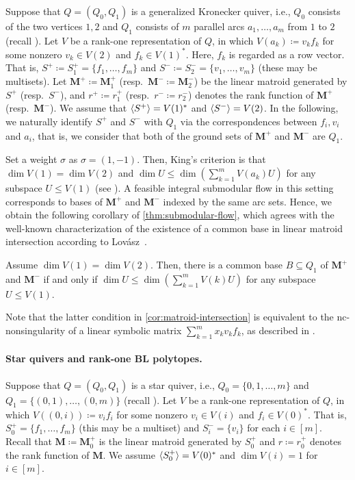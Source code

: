 \documentclass[a4paper,11pt]{article}
\numberwithin{equation}{section}
\newcommand{\M}{\mathbf{M}}
\DeclarePairedDelimiter{\spnn}{\langle}{\rangle}
\begin{document}
Suppose that $Q = (Q_0, Q_1)$ is a generalized Kronecker quiver, i.e.,
$Q_0$ consists of the two vertices $1, 2$ and $Q_1$ consists of $m$ parallel arcs $a_1, \dots, a_m$ from $1$ to $2$
(recall ).
Let $V$ be a rank-one representation of $Q$, in which
$V(a_k) \coloneqq v_k f_k$ for some nonzero $v_k \in V(2)$ and $f_k \in V(1)^*$.
Here, $f_k$ is regarded as a row vector.
That is,
$S^+ \coloneqq S_1^+ = \{ f_1, \dots, f_m \}$ and $S^- \coloneqq S_2^- = \{ v_1, \dotsc, v_m \}$ (these may be multisets).
Let $\M^+ \coloneqq \M_1^+$ (resp.\ $\M^- \coloneqq \M_2^-$) be the linear matroid generated by $S^+$ (resp.\ $S^-$), and $r^+ \coloneqq r_1^+$ (resp.\ $r^- \coloneqq r_2^-$) denotes the rank function of $\M^+$ (resp.\ $\M^-$).
We assume that $\spnn{S^+} = V(1)^*$ and $\spnn{S^-} = V(2)$.
In the following, we naturally identify $S^+$ and $S^-$ with $Q_1$ via the correspondences between $f_i, v_i$ and $a_i$,
that is, we consider that both of the ground sets of $\M^+$ and $\M^-$ are $Q_1$.

Set a weight $\sigma$ as $\sigma = (1,-1)$.
Then, King's criterion is that $\dim V(1) = \dim V(2)$ and $\dim U \le \dim(\sum_{k=1}^m V(a_k) U)$ for any subspace $U \le V(1)$ (see ).
A feasible integral submodular flow in this setting corresponds to bases of $\M^+$ and $\M^-$ indexed by the same arc sets.
Hence, we obtain the following corollary of \cref{thm:submodular-flow}, which agrees with the well-known characterization of the existence of a common base in linear matroid intersection according to Lov\'{a}sz~\citep{Lovasz1989}.

\begin{corollary}\label{cor:matroid-intersection}
  Assume $\dim V(1) = \dim V(2)$.
  Then, there is a common base $B \subseteq Q_1$ of $\M^+$ and $\M^-$ if and only if $\dim U \le \dim(\sum_{k=1}^m V(k) U)$ for any subspace $U \le V(1)$.
\end{corollary}

Note that the latter condition in \cref{cor:matroid-intersection} is equivalent to the nc-nonsingularity of a linear symbolic matrix $\sum_{k=1}^m x_k v_k f_k$, as described in .


\paragraph{Star quivers and rank-one BL polytopes.}

Suppose that $Q = (Q_0, Q_1)$ is a star quiver, i.e.,
$Q_0 = \{ 0,1, \dots, m \}$ and $Q_1 = \{ (0,1), \dots, (0,m) \}$
(recall ).
Let $V$ be a rank-one representation of $Q$, in which
$V((0,i)) \coloneqq v_i f_i$ for some nonzero $v_i \in V(i)$ and $f_i \in V(0)^*$.
That is,
$S_0^+ = \{ f_1, \dots, f_m \}$ (this may be a multiset) and $S_i^- = \{ v_i \}$ for each $i \in [m]$.
Recall that $\M \coloneqq \M_0^+$ is the linear matroid generated by $S_0^+$ and $r \coloneqq r_0^+$ denotes the rank function of $\M$.
We assume $\spnn{S_0^+} = V(0)^*$ and $\dim V(i) = 1$ for $i \in [m]$.
\end{document}
